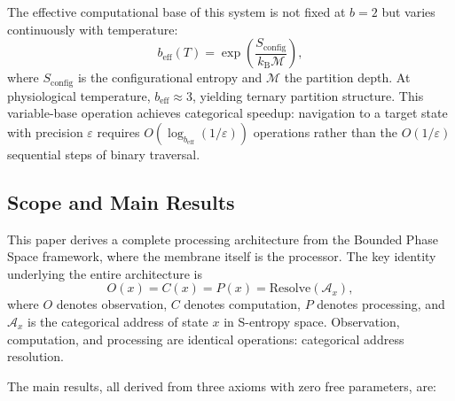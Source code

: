 \documentclass[twocolumn,10pt]{article}
\theoremstyle{remark}
\newcommand{\kB}{k_{\mathrm{B}}}
\newcommand{\Depth}{\mathcal{M}}
\newcommand{\eps}{\varepsilon}
\newcommand{\beff}{b_{\mathrm{eff}}}
\begin{document}
The effective computational base of this system is not fixed at $b = 2$ but varies continuously with temperature:
\begin{equation}
\beff(T) = \exp\!\left(\frac{S_{\mathrm{config}}}{\kB \Depth}\right),
\label{eq:beff}
\end{equation}
where $S_{\mathrm{config}}$ is the configurational entropy and $\Depth$ the partition depth. At physiological temperature, $\beff \approx 3$, yielding ternary partition structure. This variable-base operation achieves categorical speedup: navigation to a target state with precision $\eps$ requires $O(\log_{\beff}(1/\eps))$ operations rather than the $O(1/\eps)$ sequential steps of binary traversal.

\subsection{Scope and Main Results}

This paper derives a complete processing architecture from the Bounded Phase Space framework, where the membrane itself is the processor. The key identity underlying the entire architecture is
\begin{equation}
O(x) = C(x) = P(x) = \mathrm{Resolve}(\mathcal{A}_x),
\label{eq:OCP}
\end{equation}
where $O$ denotes observation, $C$ denotes computation, $P$ denotes processing, and $\mathcal{A}_x$ is the categorical address of state $x$ in S-entropy space. Observation, computation, and processing are identical operations: categorical address resolution.

The main results, all derived from three axioms with zero free parameters, are:
\end{document}
